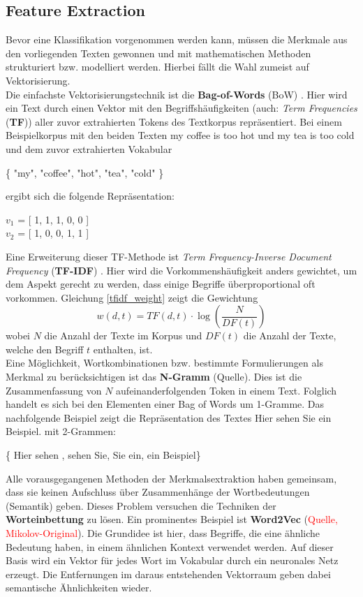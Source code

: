\subsection{Feature Extraction}
Bevor eine Klassifikation vorgenommen werden kann, müssen die Merkmale aus den vorliegenden Texten gewonnen und mit mathematischen Methoden strukturiert bzw. modelliert werden. Hierbei fällt die Wahl zumeist auf Vektorisierung.\\
Die einfachste Vektorisierungstechnik ist die \textbf{Bag-of-Words} (BoW) \citep{Ramos13}. Hier wird ein Text durch einen Vektor mit den Begriffshäufigkeiten (auch: \textit{Term Frequencies} (\textbf{TF})) aller zuvor extrahierten Tokens des Textkorpus repräsentiert. Bei einem Beispielkorpus mit den beiden Texten \glqq my coffee is too hot\grqq{} und \glqq my tea is too cold\grqq{} und dem zuvor extrahierten Vokabular
\begin{flushleft}
	\hfil\{ "my", "coffee", "hot", "tea", "cold" \}
\end{flushleft}
ergibt sich die folgende Repräsentation:
\begin{flushleft}
	\hfil$v_1$ = [ 1, 1, 1, 0, 0 ]\\
	\hfil$v_2$ = [ 1, 0, 0, 1, 1 ]
\end{flushleft}
Eine Erweiterung dieser TF-Methode ist \textit{Term Frequency-Inverse Document Frequency} (\textbf{TF-IDF}) \citep{Ramos13}.  Hier wird die Vorkommenshäufigkeit anders gewichtet, um dem Aspekt gerecht zu werden, dass einige Begriffe überproportional oft vorkommen. Gleichung \ref{tfidf_weight} zeigt die Gewichtung 
\begin{equation}
	w(d,t) = TF(d,t) \cdot \log \left( \frac{N}{{DF}(t)} \right)
	\label{tfidf_weight}
\end{equation} 
wobei $N$ die Anzahl der Texte im Korpus und ${DF}(t)$ die Anzahl der Texte, welche den Begriff $t$ enthalten, ist.\\
Eine Möglichkeit, Wortkombinationen bzw. bestimmte Formulierungen als Merkmal zu berücksichtigen ist das \textbf{N-Gramm} (Quelle). Dies ist die Zusammenfassung von $N$ aufeinanderfolgenden Token in einem Text. Folglich handelt es sich bei den Elementen einer Bag of Words um 1-Gramme. Das nachfolgende Beispiel zeigt die Repräsentation des Textes \glqq Hier sehen Sie ein Beispiel.\grqq{} mit 2-Grammen:
\begin{flushleft}
	\hfil \{ \grqq Hier sehen \grqq, \grqq sehen Sie\grqq, \grqq Sie ein\grqq, \grqq ein Beispiel\grqq \}
\end{flushleft}
Alle vorausgegangenen Methoden der Merkmalsextraktion haben gemeinsam, dass sie keinen Aufschluss über Zusammenhänge der Wortbedeutungen (Semantik) geben. Dieses Problem versuchen die Techniken der \textbf{Worteinbettung} zu lösen. Ein prominentes Beispiel ist \textbf{Word2Vec} (\textcolor{red}{Quelle, Mikolov-Original}). Die Grundidee ist hier, dass Begriffe, die eine ähnliche Bedeutung haben, in einem ähnlichen Kontext verwendet werden. Auf dieser Basis wird ein Vektor für jedes Wort im Vokabular durch ein neuronales Netz erzeugt. Die Entfernungen im daraus entstehenden Vektorraum geben dabei semantische Ähnlichkeiten wieder.
